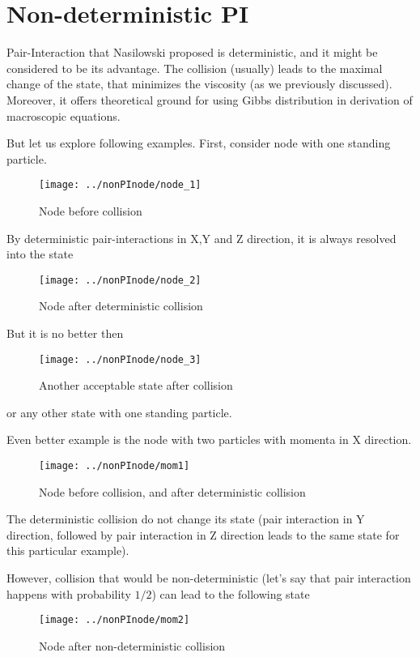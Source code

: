 \chapter{Non-deterministic PI}

Pair-Interaction that Nasilowski proposed is deterministic, and it might be considered to be its advantage. 
The collision (usually) leads to the maximal change of the state, that minimizes the viscosity (as we previously discussed).
Moreover, it offers theoretical ground for using Gibbs distribution in derivation of macroscopic equations.

\bigskip

But let us explore following examples.
First, consider node with one standing particle.
\begin{figure}[h]
 \centering 
 \texttt{[image: ../nonPInode/node\_1]}
 \label{transitions}
 \caption{Node before collision}
\end{figure}

By deterministic pair-interactions in X,Y and Z direction, it is always resolved into the state
\begin{figure}[h]
 \centering 
 \texttt{[image: ../nonPInode/node\_2]}
 \label{transitions}
 \caption{Node after deterministic collision}
\end{figure}

But it is no better then

\begin{figure}[h]
 \centering 
 \texttt{[image: ../nonPInode/node\_3]}
 \label{transitions}
 \caption{Another acceptable state after collision}
\end{figure}

or any other state with one standing particle.

\bigskip
\newpage
Even better example is the node with two particles with momenta in X direction.
\begin{figure}[htbp]
 \centering 
 \texttt{[image: ../nonPInode/mom1]}
 \label{transitions}
 \caption{Node before collision, and after deterministic collision}
\end{figure}

The deterministic collision do not change its state (pair interaction in Y direction, followed by pair interaction in Z direction leads to the same state for this particular example).

However, collision that would be non-deterministic (let's say that pair interaction happens with probability $1/2$) can lead to the following state
\begin{figure}[htbp]
 \centering 
 \texttt{[image: ../nonPInode/mom2]}
 \label{transitions}
 \caption{Node after non-deterministic collision}
\end{figure}

